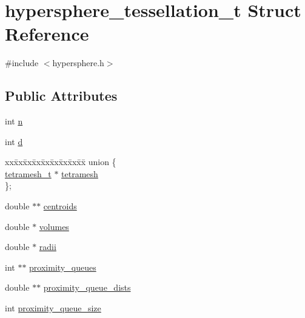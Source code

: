 \hypertarget{structhypersphere__tessellation__t}{
\section{hypersphere\_\-tessellation\_\-t Struct Reference}
\label{structhypersphere__tessellation__t}
}


{\ttfamily \#include $<$hypersphere.h$>$}

\subsection*{Public Attributes}
\begin{DoxyCompactItemize}
\item 
int \hyperlink{structhypersphere__tessellation__t_aba8398c682a35ef1a8834f2023f86569}{n}
\item 
int \hyperlink{structhypersphere__tessellation__t_a32d3e8a25880ee139ced3ec658c41b89}{d}
\item 
\begin{tabbing}
xx\=xx\=xx\=xx\=xx\=xx\=xx\=xx\=xx\=\kill
union \{\\
\>\hyperlink{structtetramesh__t}{tetramesh\_t} $\ast$ \hyperlink{structhypersphere__tessellation__t_a0d6d3953f9e958a2f78df65dc2b3b4ee}{tetramesh}\\
\}; \\

\end{tabbing}\item 
double $\ast$$\ast$ \hyperlink{structhypersphere__tessellation__t_a6cedeba23c0a5c74622e38195418f73d}{centroids}
\item 
double $\ast$ \hyperlink{structhypersphere__tessellation__t_a5cbab443a7da8fb4a0b836b6ae613c23}{volumes}
\item 
double $\ast$ \hyperlink{structhypersphere__tessellation__t_a5963abed3c6d469bae3fd16301ed0f5b}{radii}
\item 
int $\ast$$\ast$ \hyperlink{structhypersphere__tessellation__t_a5c048480704e641e48eeb911335f5033}{proximity\_\-queues}
\item 
double $\ast$$\ast$ \hyperlink{structhypersphere__tessellation__t_a82dfe3762cc181b9ab4cb37b8a570bff}{proximity\_\-queue\_\-dists}
\item 
int \hyperlink{structhypersphere__tessellation__t_acf2c565f1225caa258e1930821a90fcc}{proximity\_\-queue\_\-size}
\end{DoxyCompactItemize}



